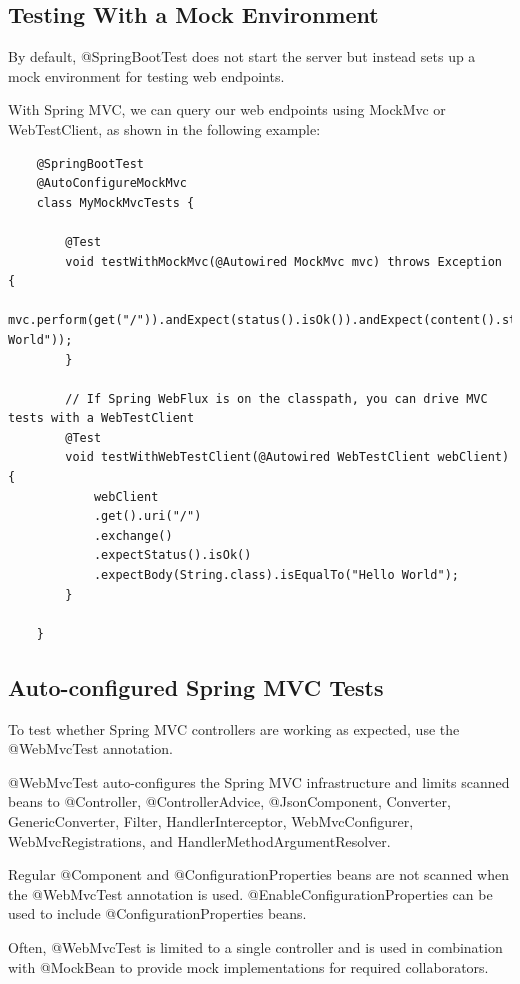 \documentclass{scrartcl}
\begin{document}
\subsection{Testing With a Mock Environment}

By default, @SpringBootTest does not start the server but instead sets up a mock environment for testing web endpoints.

With Spring MVC, we can query our web endpoints using MockMvc or WebTestClient, as shown in the following example:

\begin{lstlisting}
    @SpringBootTest
    @AutoConfigureMockMvc
    class MyMockMvcTests {

        @Test
        void testWithMockMvc(@Autowired MockMvc mvc) throws Exception {
            mvc.perform(get("/")).andExpect(status().isOk()).andExpect(content().string("Hello World"));
        }

        // If Spring WebFlux is on the classpath, you can drive MVC tests with a WebTestClient
        @Test
        void testWithWebTestClient(@Autowired WebTestClient webClient) {
            webClient
            .get().uri("/")
            .exchange()
            .expectStatus().isOk()
            .expectBody(String.class).isEqualTo("Hello World");
        }

    }

\end{lstlisting}

\subsection{Auto-configured Spring MVC Tests}

To test whether Spring MVC controllers are working as expected, use the @WebMvcTest annotation.

@WebMvcTest auto-configures the Spring MVC infrastructure and limits scanned beans to @Controller, @ControllerAdvice, @JsonComponent, Converter, GenericConverter, Filter, HandlerInterceptor, WebMvcConfigurer, WebMvcRegistrations, and HandlerMethodArgumentResolver.

Regular @Component and @ConfigurationProperties beans are not scanned when the @WebMvcTest annotation is used. @EnableConfigurationProperties can be used to include @ConfigurationProperties beans.

Often, @WebMvcTest is limited to a single controller and is used in combination with @MockBean to provide mock implementations for required collaborators.
\end{document}
